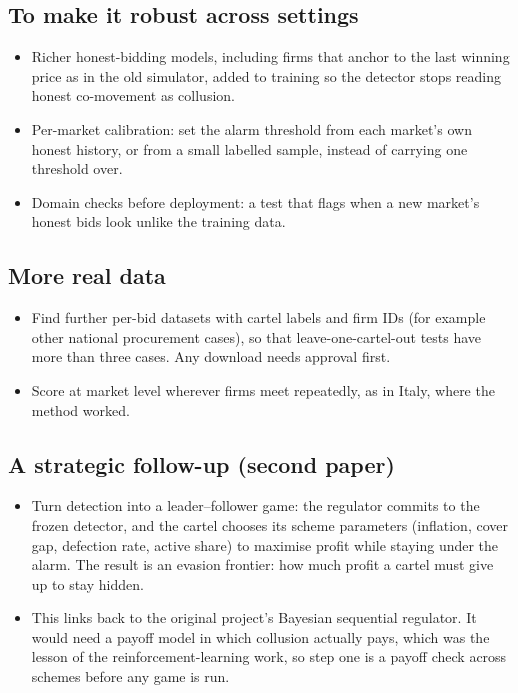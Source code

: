 \documentclass[11pt,a4paper]{article}
\begin{document}
\subsection{To make it robust across settings}
\begin{itemize}
\item Richer honest-bidding models, including firms that anchor to the last winning price as in the old simulator, added to training so the detector stops reading honest co-movement as collusion.
\item Per-market calibration: set the alarm threshold from each market's own honest history, or from a small labelled sample, instead of carrying one threshold over.
\item Domain checks before deployment: a test that flags when a new market's honest bids look unlike the training data.
\end{itemize}

\subsection{More real data}
\begin{itemize}
\item Find further per-bid datasets with cartel labels and firm IDs (for example other national procurement cases), so that leave-one-cartel-out tests have more than three cases. Any download needs approval first.
\item Score at market level wherever firms meet repeatedly, as in Italy, where the method worked.
\end{itemize}

\subsection{A strategic follow-up (second paper)}
\begin{itemize}
\item Turn detection into a leader--follower game: the regulator commits to the frozen detector, and the cartel chooses its scheme parameters (inflation, cover gap, defection rate, active share) to maximise profit while staying under the alarm. The result is an evasion frontier: how much profit a cartel must give up to stay hidden.
\item This links back to the original project's Bayesian sequential regulator. It would need a payoff model in which collusion actually pays, which was the lesson of the reinforcement-learning work, so step one is a payoff check across schemes before any game is run.
\end{itemize}
\end{document}
